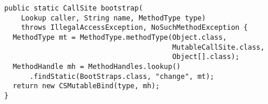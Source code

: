 {\scriptsize \begin{verbatim}
  public static CallSite bootstrap(
      Lookup caller, String name, MethodType type)
      throws IllegalAccessException, NoSuchMethodException {
    MethodType mt = MethodType.methodType(Object.class,
                                          MutableCallSite.class,
                                          Object[].class);
    MethodHandle mh = MethodHandles.lookup()
        .findStatic(BootStraps.class, "change", mt);
    return new CSMutableBind(type, mh);
  }
\end{verbatim} }
